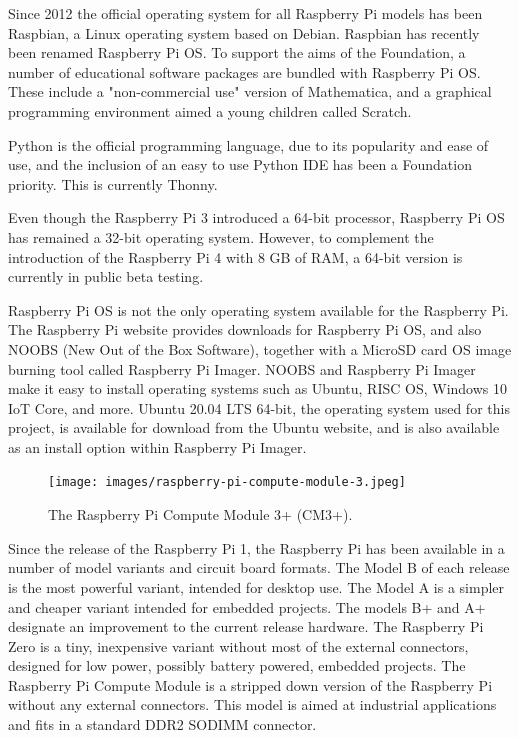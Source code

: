 \documentclass{report}
\begin{document}
Since 2012 the official operating system for all Raspberry Pi models has been Raspbian, a Linux operating system based on Debian. Raspbian has recently been renamed Raspberry Pi OS. To support the aims of the Foundation, a number of educational software packages are bundled with Raspberry Pi OS. These include a "non-commercial use" version of Mathematica, and a graphical programming environment aimed a young children called Scratch.

Python is the official programming language, due to its popularity and ease of use, and the inclusion of an easy to use Python IDE has been a Foundation priority. This is currently Thonny. 

Even though the Raspberry Pi 3 introduced a 64-bit processor, Raspberry Pi OS has remained a 32-bit operating system. However, to complement the introduction of the Raspberry Pi 4 with 8 GB of RAM, a 64-bit version is currently in public beta testing.

Raspberry Pi OS is not the only operating system available for the Raspberry Pi. The Raspberry Pi website provides downloads for Raspberry Pi OS, and also NOOBS (New Out of the Box Software), together with a MicroSD card OS image burning tool called Raspberry Pi Imager. NOOBS and Raspberry Pi Imager make it easy to install operating systems such as Ubuntu, RISC OS, Windows 10 IoT Core, and more. Ubuntu 20.04 LTS 64-bit, the operating system used for this project, is available for download from the Ubuntu website, and is also available as an install option within Raspberry Pi Imager.

\begin{figure}
	\centering	
	\texttt{[image: images/raspberry-pi-compute-module-3.jpeg]}
	\caption{The Raspberry Pi Compute Module 3+ (CM3+).}
\end{figure}

Since the release of the Raspberry Pi 1, the Raspberry Pi has been available in a number of model variants and circuit board formats. The Model B of each release is the most powerful variant, intended for desktop use. The Model A is a simpler and cheaper variant intended for embedded projects. The models B+ and A+ designate an improvement to the current release hardware. The Raspberry Pi Zero is a tiny, inexpensive variant without most of the external connectors, designed for low power, possibly battery powered, embedded projects. The Raspberry Pi Compute Module is a stripped down version of the Raspberry Pi without any external connectors. This model is aimed at industrial applications and fits in a standard DDR2 SODIMM connector.
\end{document}

